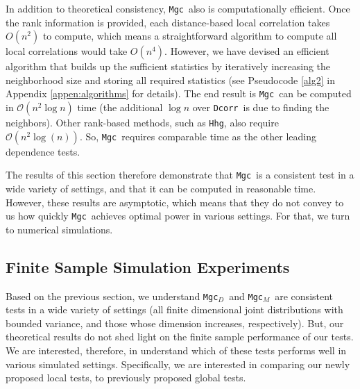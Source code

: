 \documentclass[11pt]{article}
\providecommand{\sct}[1]{{\sc \texttt{#1}}}
\newcommand{\Mgc}{\sct{Mgc}}
\newcommand{\Mgcp}{\sct{Mgc$_P$}}
\newcommand{\Mgcd}{\sct{Mgc$_D$}}
\newcommand{\Mgcm}{\sct{Mgc$_M$}}
\newcommand{\Hhg}{\sct{Hhg}}
\newcommand{\Dcorr}{\sct{Dcorr}}
\newcommand{\Mcorr}{\sct{Mcorr}}
\begin{document}
In addition to theoretical consistency, \Mgc~also is computationally efficient. Once the rank information is provided, each distance-based local correlation takes $O(n^2)$ to compute, which means a straightforward algorithm to compute all local correlations would take $O(n^4)$. However, we have devised an efficient  algorithm that builds up the sufficient statistics by iteratively increasing the neighborhood size and storing all required statistics (see Pseudocode \ref{alg2} in Appendix \ref{appen:algorithms} for details).  The end result is \Mgc~can be computed in $\mathcal{O}(n^2 \log n)$ time (the additional $\log n$ over \Dcorr~is due to finding the neighbors).
Other rank-based methods, such as \Hhg, also require  $\mathcal{O}(n^2\log(n))$. So, \Mgc~requires comparable time as the other leading dependence tests. 

The results of this section therefore demonstrate that \Mgc~is a consistent test in a wide variety of settings, and that it can be computed in reasonable time.  However, these results are asymptotic, which means that they do not convey to us how quickly \Mgc~achieves optimal power in various settings.  For that, we turn to numerical simulations.

\subsection{Finite Sample Simulation Experiments}


Based on the previous section, we understand \Mgcd~and \Mgcm~are consistent tests in a wide variety of settings (all finite dimensional joint distributions with bounded variance, and those whose dimension increases, respectively).  But, our theoretical results do not shed light on the finite sample performance of our tests.
% 
We are interested, therefore, in understand which of these tests performs well in various simulated settings.  Specifically, we are interested in comparing our newly proposed local tests, 
to previously proposed global tests.  
\end{document}
